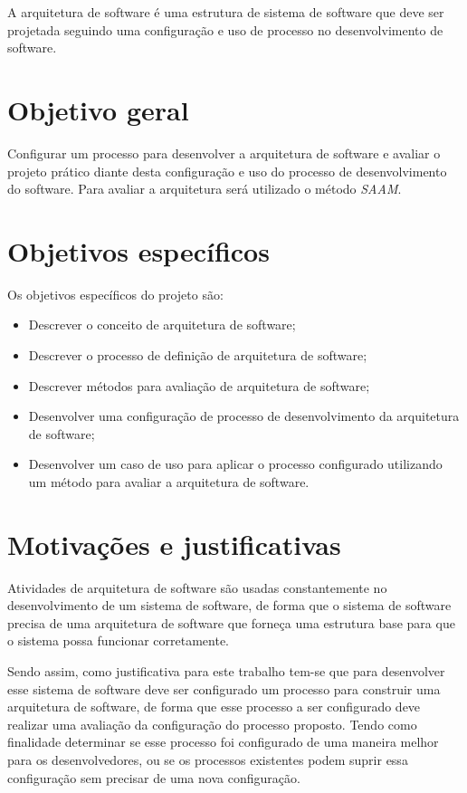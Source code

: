 A arquitetura de software é uma estrutura de sistema de software que deve ser projetada seguindo uma configuração e uso de processo no desenvolvimento de software.

\section{Objetivo geral}

Configurar um processo para desenvolver a arquitetura de software 
e avaliar o projeto prático diante desta configuração e uso do processo de desenvolvimento do software.
Para avaliar a arquitetura será utilizado o método \emph{\acrfull{SAAM}}.

\section{Objetivos específicos}

Os objetivos específicos do projeto são:
\begin{itemize}
    \item Descrever o conceito de arquitetura de software;
    \item Descrever o processo de definição de arquitetura de software;
    \item Descrever métodos para avaliação de arquitetura de software;
    \item Desenvolver uma configuração de processo de desenvolvimento da arquitetura de software;
    \item Desenvolver um caso de uso para aplicar o processo configurado utilizando um método para avaliar a arquitetura de software.
\end{itemize}

\section{Motivações e justificativas}

Atividades de arquitetura de software são usadas constantemente no desenvolvimento de um sistema de software, de forma que o sistema de software precisa de uma arquitetura de software que forneça uma estrutura base para que o sistema possa funcionar corretamente.


Sendo assim, como justificativa para este trabalho tem-se que para desenvolver esse sistema de software deve ser configurado um processo para construir uma arquitetura de software, de forma que esse processo a ser configurado deve realizar uma avaliação da configuração do processo proposto. Tendo como finalidade determinar se esse processo foi configurado de uma maneira melhor para os desenvolvedores, ou se os processos existentes podem suprir essa configuração sem precisar de uma nova configuração.


